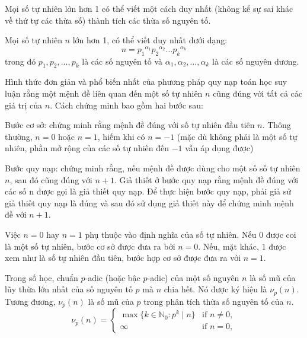 \documentclass[../imo-training-open-book.tex]{subfiles}
\begin{document}
\begin{theorem*} 
    \label{theorem:Fundamental Theorem of Arithmetic}
    Mọi số tự nhiên lớn hơn 1 có thể viết một cách duy nhất (không kể sự sai khác về thứ tự các thừa số) thành tích các thừa số nguyên tố.
    
    Mọi số tự nhiên $n$ lớn hơn 1, có thể viết duy nhất dưới dạng:
    \[
        n={p_{1}}^{\alpha _{1}}{p_{2}}^{\alpha _{2}}{\dots }{p_{k}}^{\alpha _{k}}
    \]
    trong đó $p_{1},p_{2},\ldots,p_{k}$ là các số nguyên tố và $\alpha _{1},\alpha _{2},\dots ,\alpha _{k}$ là các số nguyên dương.
\end{theorem*}

\begin{theorem*} 
    \label{theorem:Induction Principle}
    Hình thức đơn giản và phổ biến nhất của phương pháp quy nạp toán học suy luận rằng một mệnh đề liên quan đến một số tự nhiên $n$ cũng đúng với tất cả các giá trị của $n$.
    Cách chứng minh bao gồm hai bước sau:

    Bước cơ sở: chứng minh rằng mệnh đề đúng với số tự nhiên đầu tiên $n$. Thông thường, $n = 0$ hoặc $n = 1$, hiếm khi có $n = -1$
    (mặc dù không phải là một số tự nhiên, phần mở rộng của các số tự nhiên đến $-1$ vẫn áp dụng được)
    
    Bước quy nạp: chứng minh rằng, nếu mệnh đề được dùng cho một số số tự nhiên $n$, sau đó cũng đúng với $n + 1$.
    Giả thiết ở bước quy nạp rằng mệnh đề đúng với các số n được gọi là giả thiết quy nạp.
    Để thực hiện bước quy nạp, phải giả sử giả thiết quy nạp là đúng và sau đó sử dụng giả thiết này để chứng minh mệnh đề với $n + 1$.
    
    Việc $n = 0$ hay $n = 1$ phụ thuộc vào định nghĩa của số tự nhiên. Nếu $0$ được coi là một số tự nhiên, bước cơ sở được đưa ra bởi $n = 0$.
    Nếu, mặt khác, $1$ được xem như là số tự nhiên đầu tiên, bước hợp cơ sở được đưa ra với $n = 1$.
\end{theorem*}

\begin{definition*} 
    \label{theorem:p-adic valuation}
    Trong số học, chuẩn \( p \)-adic (hoặc bậc \( p \)-adic) của một số nguyên \( n \) là số mũ của lũy thừa lớn nhất của số nguyên tố \( p \) mà \( n \) chia hết.
    Nó được ký hiệu là \( \nu_p(n) \). Tương đương, \( \nu_p(n) \) là số mũ của \( p \) trong phân tích thừa số nguyên tố của \( n \).
    \[
        \nu_p(n) = 
        \begin{cases}
            \max \{ k \in \mathbb{N}_0 : p^k \mid n \} & \text{if } n \neq 0, \\
            \infty & \text{if } n = 0,
        \end{cases}
    \]
\end{definition*}
\end{document}

